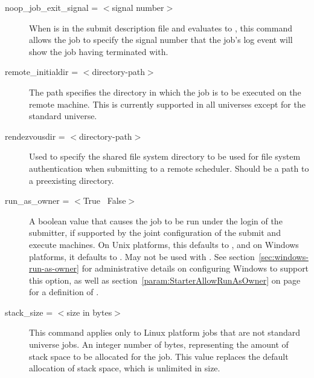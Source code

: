 \begin{description}

\label{man-condor-submit-noop-job-exit-signal}
\item[noop\_job\_exit\_signal = $<$signal number$>$]
When  is in the submit description file
and evaluates to ,
this command allows the job
to specify the signal number that the job's log event will show
the job having terminated with.


\label{man-condor-submit-remote-initialdir}
\item[remote\_initialdir = $<$directory-path$>$]
The path specifies the directory in which the job is to be
executed on the remote machine.  This is currently supported in all
universes except for the standard universe.


\label{man-condor-submit-rendezvousdir}
\item[rendezvousdir = $<$directory-path$>$] Used to specify the
shared file system directory to be used for file system authentication
when submitting to a remote scheduler.  Should be a path to a preexisting
directory.



\label{man-condor-submit-run-as-owner}
\item[run\_as\_owner = $<$True \Bar\ False$>$]
A boolean value that causes the job to be run under the login of 
the submitter,
if supported by the joint configuration of the submit and execute machines.
On Unix platforms, this defaults to ,
and on Windows platforms, it defaults to .
May not be used with .
See section~\ref{sec:windows-run-as-owner} for administrative details on
configuring Windows to support this option, as well as 
section~\ref{param:StarterAllowRunAsOwner}
on page~\pageref{param:StarterAllowRunAsOwner} for a definition of
.


\label{man-condor-submit-stack-size}
\item[stack\_size = $<$size in bytes$>$]
This command applies only to Linux platform jobs that are not standard
universe jobs.
An integer number of bytes, representing the amount of stack space to be 
allocated for the job.
This value replaces the default allocation of stack space,
which is unlimited in size.


\end{description}
